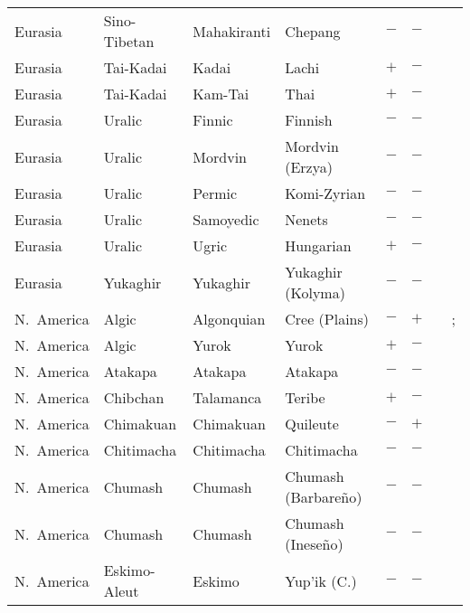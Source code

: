 \begin{landscape}
\begin{longtable}{l>{\raggedright\arraybackslash}p{2.2cm}>{\raggedright}p{2.5cm}>{\raggedright\arraybackslash}p{2.5cm}cc>{\raggedright\arraybackslash}p{3.4cm}>{\raggedright\arraybackslash}p{3.4cm}}
Eurasia & Sino-Tibetan & Mahakiranti & Chepang & $-$ & $-$ & \citealt{Gil2013} & \citealt[42, 50, 51, 55]{Caughley1982}\\
Eurasia & Tai-Kadai & Kadai & Lachi & $+$ & $-$ & \citealt{Gil2013} & \citealt[68--77]{Kosaka2000}\\
Eurasia & Tai-Kadai & Kam-Tai & Thai & $+$ & $-$ & \citealt{Gil2013} & \citealt{Corbett2013}\\
Eurasia & Uralic & Finnic & Finnish & $-$ & $-$ & \citealt{Gil2013} & \citealt{Corbett2013}\\
Eurasia & Uralic & Mordvin & Mordvin (Erzya) & $-$ & $-$ & \citealt{Gil2013} & \citealt[191--197]{Zaicz1998}\\
Eurasia & Uralic & Permic & Komi-Zyrian & $-$ & $-$ & \citealt{Gil2013} & \citealt[295]{Nichols1992}\\
Eurasia & Uralic & Samoyedic & Nenets & $-$ & $-$ & \citealt{Gil2013} & \citealt{Corbett2013}\\
Eurasia & Uralic & Ugric & Hungarian & $+$ & $-$ & \citealt{Gil2013} & \citealt{Corbett2013}\\
Eurasia & Yukaghir & Yukaghir & Yukaghir (Kolyma) & $-$ & $-$ & \citealt{Gil2013} & \citealt{Corbett2013}\\
N.~America & Algic & Algonquian & Cree (Plains) & $-$ & $+$ & \citealt{Gil2013} & \citealt{Corbett2013}; \citealt[20--24, 33--38]{Wolfart1973}\\
N.~America & Algic & Yurok & Yurok & $+$ & $-$ & \citealt[299]{Nichols1992}& \citealt{Corbett2013}\\
N.~America & Atakapa & Atakapa & Atakapa & $-$ & $-$ & \citealt{Gil2013} & \citealt[125, 136--140]{Swanton1929}\\
N.~America & Chibchan & Talamanca & Teribe & $+$ & $-$ & \citealt{Gil2013} & \citealt[passim]{Quesada2010}\\
N.~America & Chimakuan & Chimakuan & Quileute & $-$ & $+$ & \citealt{Gil2013} & \citealt[299]{Nichols1992}\\
N.~America & Chitimacha & Chitimacha & Chitimacha & $-$ & $-$ & \citealt{Gil2013} & \citealt[52--53, 78--85]{Granberry2004}\\
N.~America & Chumash & Chumash & Chumash (Barbareño) & $-$ & $-$ & \citealt{Gil2013} & \citealt[passim]{Wash2001}\\
N.~America & Chumash & Chumash & Chumash (Ineseño) & $-$ & $-$ & \citealt{Gil2013} & \citealt[passim]{Applegate1972}\\
N.~America & Eskimo-Aleut & Eskimo & Yup'ik (C.) & $-$ & $-$ & \citealt[201--207]{Reed1977}& \citealt{Corbett2013}\\

\end{longtable}
\end{landscape}
